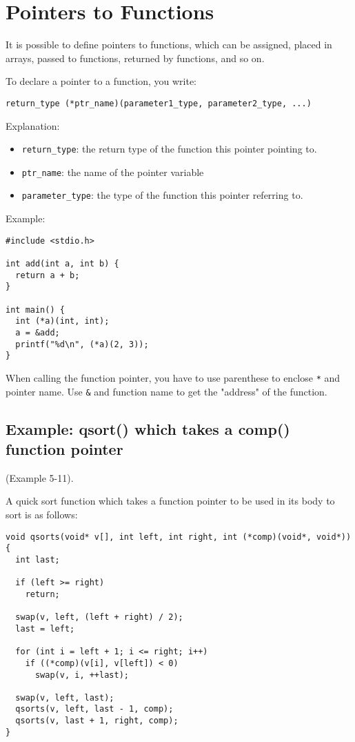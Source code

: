 \documentclass[12pt]{article}
\begin{document}
\section{Pointers to Functions}
\label{sec:org019e07a}
It is possible to define pointers to functions, which can be assigned, placed in arrays, passed to functions, returned by functions, and so on.

To declare a pointer to a function, you write:
\begin{verbatim}
return_type (*ptr_name)(parameter1_type, parameter2_type, ...)
\end{verbatim}
Explanation:
\begin{itemize}
\item \texttt{return\_type}: the return type of the function this pointer pointing to.
\item \texttt{ptr\_name}: the name of the pointer variable
\item \texttt{parameter\_type}: the type of the function this pointer referring to.
\end{itemize}

Example:
\begin{verbatim}
#include <stdio.h>

int add(int a, int b) {
  return a + b;
}

int main() {
  int (*a)(int, int);
  a = &add;
  printf("%d\n", (*a)(2, 3));
}
\end{verbatim}
When calling the function pointer, you have to use parenthese to enclose \texttt{*} and pointer name. Use \texttt{\&} and function name to get the "address" of the function.

\subsection{Example: qsort() which takes a comp() function pointer}
\label{sec:org80bb4fe}
(Example 5-11).

A quick sort function which takes a function pointer to be used in its body to sort is as follows:
\begin{verbatim}
void qsorts(void* v[], int left, int right, int (*comp)(void*, void*)) {
  int last;

  if (left >= right)
    return;

  swap(v, left, (left + right) / 2);
  last = left;

  for (int i = left + 1; i <= right; i++)
    if ((*comp)(v[i], v[left]) < 0)
      swap(v, i, ++last);

  swap(v, left, last);
  qsorts(v, left, last - 1, comp);
  qsorts(v, last + 1, right, comp);
}
\end{verbatim}
\end{document}
